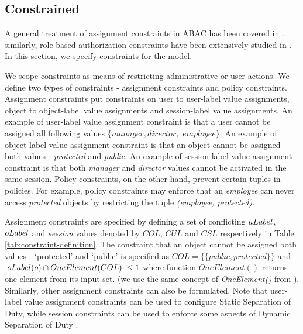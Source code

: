 	
	
	
	
	\subsection{Constrained \eapABAC{}}
	A general treatment of assignment constraints in ABAC has been covered in  \cite{abcl}. similarly, role based authorization constraints have been extensively studied in \cite{rcl}.	
	In this section, we specify constraints for the \eapABAC{} model. 
	
	We scope constraints as  means of restricting administrative or user actions. We define two types of constraints - assignment constraints and  policy constraints. Assignment constraints put constraints on user to user-label value assignments,  object to object-label value assignments and session-label value assignments. An example of user-label value assignment constraint is that a user cannot be assigned all following values $\{manager, director,$  $employee\}$.  An example of object-label value assignment constraint is that an object cannot be assigned both values - \textit{protected} and \textit{public}. An example of session-label value assignment constraint is that both \textit{manager} and \textit{director} values cannot be activated in the same session.	 Policy constraints, on the other hand,  prevent certain tuples in policies. For example, policy constraints may enforce that an \textit{employee} can never access \textit{protected} objects by restricting the tuple \textit{(employee, protected)}.  
	
	
	
	
		
		 
		 
	Assignment constraints are specified by defining a set of conflicting $uLabel$, $oLabel$ and \textit{session} values denoted by $COL$, $CUL$ and $CSL$ respectively in Table \ref{tab:constraint-definition}.  The constraint that an object cannot be assigned both values - `protected' and `public' is specified as $COL=\{\{public, protected\}\}$ and $ |oLabel(o) \cap OneElement(COL)| \le 1$ where function $OneElement()$ returns one element from its input set. (we use the same concept of \textit{OneElement()} from \cite{rcl}).  Similarly, other  assignment constraints can also be formulated. Note that user-label value assignment constraints can be used to configure  Static Separation of Duty, while session constraints can be used to enforce some aspects of  Dynamic Separation of Duty \cite{dsod}.

